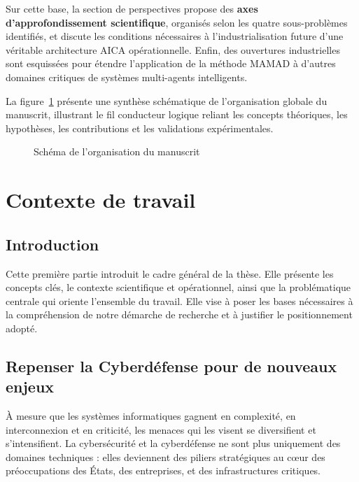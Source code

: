 \documentclass[ twoside,openright,titlepage,numbers=noenddot,headinclude,%
                footinclude=true,cleardoublepage=empty,abstractoff, %
                BCOR=5mm,paper=a4,fontsize=11pt,%
                french,american,%
                ]{scrreprt}
\begin{document}
Sur cette base, la section de perspectives propose des \textbf{axes d'approfondissement scientifique}, organisés selon les quatre sous-problèmes identifiés, et discute les conditions nécessaires à l'industrialisation future d'une véritable architecture AICA opérationnelle. Enfin, des ouvertures industrielles sont esquissées pour étendre l'application de la méthode MAMAD à d'autres domaines critiques de systèmes multi-agents intelligents.

\medskip

La figure~\ref{fig:organisation_manuscrit} présente une synthèse schématique de l'organisation globale du manuscrit, illustrant le fil conducteur logique reliant les concepts théoriques, les hypothèses, les contributions et les validations expérimentales.

\begin{figure}[h!]
    \centering
    \resizebox{\textwidth}{!}{%
        
    }
    \caption{Schéma de l'organisation du manuscrit}
    \label{fig:organisation_manuscrit}
\end{figure}



\part{Contexte de travail}

\chapter*{Introduction}

Cette première partie introduit le cadre général de la thèse. Elle présente les concepts clés, le contexte scientifique et opérationnel, ainsi que la problématique centrale qui oriente l'ensemble du travail. Elle vise à poser les bases nécessaires à la compréhension de notre démarche de recherche et à justifier le positionnement adopté.

\chapter{Repenser la Cyberdéfense pour de nouveaux enjeux}

\noindent
À mesure que les systèmes informatiques gagnent en complexité, en interconnexion et en criticité, les menaces qui les visent se diversifient et s'intensifient. La cybersécurité et la cyberdéfense ne sont plus uniquement des domaines techniques : elles deviennent des piliers stratégiques au cœur des préoccupations des États, des entreprises, et des infrastructures critiques.
\end{document}
